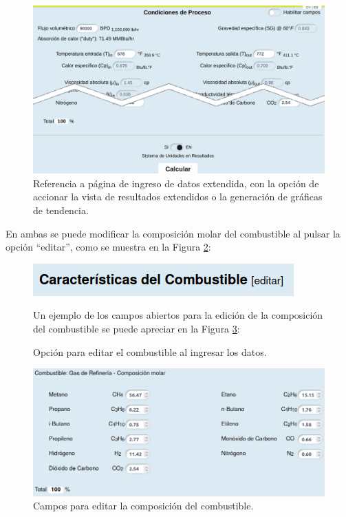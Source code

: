 \begin{figure}[hbt]
\begin{center}
\includegraphics[scale=0.3]{images/datos2}
\caption[Página de ingreso de datos extendida]{Referencia a página de ingreso de datos extendida, con la opción de accionar la vista de resultados extendidos o la generación de gráficas de tendencia.}
\label{fig:fulldatos}
\end{center}
\end{figure}
\par En ambas se puede modificar la composición molar del combustible al pulsar la opción ``editar'', como se muestra en la Figura \ref{fig:edit_fuel}:
\begin{figure}[H]
\begin{center}
\includegraphics[scale=0.6]{images/edit_fuel}
\caption[Opción para editar el combustible]{Opción para editar el combustible al ingresar los datos.}
\label{fig:edit_fuel}
\end{center}
\par Un ejemplo de los campos abiertos para la edición de la composición del combustible se puede apreciar en la Figura \ref{fig:edit_fuel_ext}:
\end{figure}
\begin{figure}[hbt]
\begin{center}
\includegraphics[scale=0.45]{images/edit_fuel_ext}
\caption[Campos para editar la composición del combustible]{Campos para editar la composición del combustible.}
\label{fig:edit_fuel_ext}
\end{center}
\end{figure}

